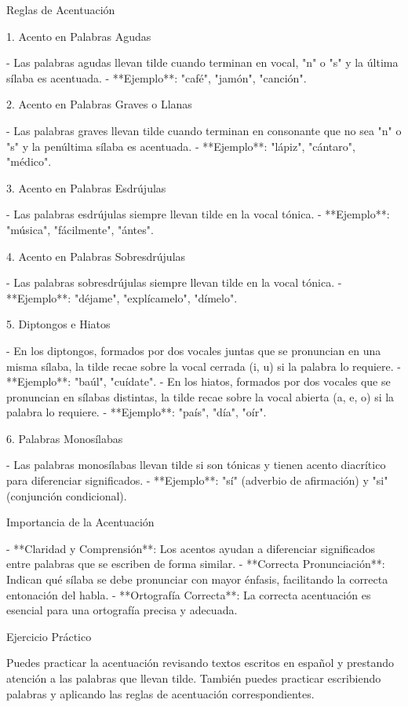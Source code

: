  Reglas de Acentuación

 1. Acento en Palabras Agudas

- Las palabras agudas llevan tilde cuando terminan en vocal, "n" o "s" y la última sílaba es acentuada.
- **Ejemplo**: "café", "jamón", "canción".

 2. Acento en Palabras Graves o Llanas

- Las palabras graves llevan tilde cuando terminan en consonante que no sea "n" o "s" y la penúltima sílaba es acentuada.
- **Ejemplo**: "lápiz", "cántaro", "médico".

 3. Acento en Palabras Esdrújulas

- Las palabras esdrújulas siempre llevan tilde en la vocal tónica.
- **Ejemplo**: "música", "fácilmente", "ántes".

 4. Acento en Palabras Sobresdrújulas

- Las palabras sobresdrújulas siempre llevan tilde en la vocal tónica.
- **Ejemplo**: "déjame", "explícamelo", "dímelo".

 5. Diptongos e Hiatos

- En los diptongos, formados por dos vocales juntas que se pronuncian en una misma sílaba, la tilde recae sobre la vocal cerrada (i, u) si la palabra lo requiere.
  - **Ejemplo**: "baúl", "cuídate".
- En los hiatos, formados por dos vocales que se pronuncian en sílabas distintas, la tilde recae sobre la vocal abierta (a, e, o) si la palabra lo requiere.
  - **Ejemplo**: "país", "día", "oír".

 6. Palabras Monosílabas

- Las palabras monosílabas llevan tilde si son tónicas y tienen acento diacrítico para diferenciar significados.
  - **Ejemplo**: "sí" (adverbio de afirmación) y "si" (conjunción condicional).

 Importancia de la Acentuación

- **Claridad y Comprensión**: Los acentos ayudan a diferenciar significados entre palabras que se escriben de forma similar.
- **Correcta Pronunciación**: Indican qué sílaba se debe pronunciar con mayor énfasis, facilitando la correcta entonación del habla.
- **Ortografía Correcta**: La correcta acentuación es esencial para una ortografía precisa y adecuada.

 Ejercicio Práctico

Puedes practicar la acentuación revisando textos escritos en español y prestando atención a las palabras que llevan tilde. También puedes practicar escribiendo palabras y aplicando las reglas de acentuación correspondientes.


